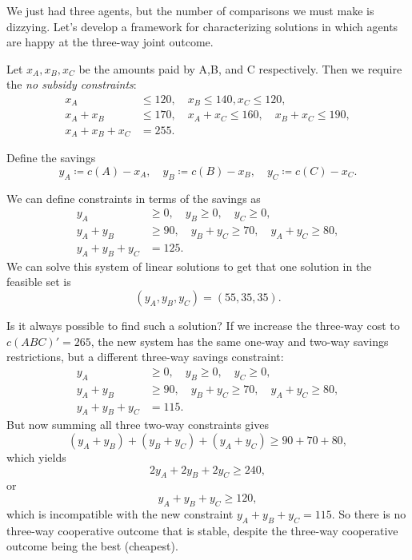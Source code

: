 We just had three agents, but the number of comparisons we must make is dizzying.
Let's develop a framework for characterizing solutions in which agents are happy at the three-way joint outcome.

Let $x_A, x_B, x_C$ be the amounts paid by A,B, and C respectively.
Then we require the \emph{no subsidy constraints}:
\begin{align*}
	x_A &\le 120, \quad x_B \le 140, x_C \le 120, \\
	x_A + x_B &\le 170, \quad x_A + x_C \le 160, \quad x_B+ x_C \le 190, \\
	x_A+x_B + x_C &= 255
.\end{align*}

Define the savings \[
	y_A \coloneqq c(A) - x_A, \quad y_B \coloneqq c(B) - x_B, \quad y_C \coloneqq c(C) - x_C
.\] 

We can define constraints in terms of the savings as
\begin{align*}
	y_A &\ge 0, \quad y_B \ge 0, \quad y_C \ge 0,\\
	y_A + y_B &\ge 90, \quad y_B + y_C \ge 70, \quad y_A + y_C \ge 80, \\
	y_A + y_B + y_C &= 125
.\end{align*}
We can solve this system of linear solutions to get that one solution in the feasible set is \[
	\left( y_A,y_B,y_C \right) = \left( 55, 35, 35 \right)
.\] 

Is it always possible to find such a solution?
If we increase the three-way cost to $c(ABC)' = 265$, the new system has the same one-way and two-way savings restrictions, but a different three-way savings constraint:
\begin{align*}
	y_A &\ge 0, \quad y_B \ge 0, \quad y_C \ge 0,\\
	y_A + y_B &\ge 90, \quad y_B + y_C \ge 70, \quad y_A + y_C \ge 80, \\
	y_A + y_B + y_C &= 115
.\end{align*}
But now summing all three two-way constraints gives \[
	(y_A + y_B) + (y_B + y_C) + (y_A + y_C) \ge 90 + 70 + 80
,\] which yields \[
	2 y_A + 2y_B + 2y_C \ge 240
,\] or \[
	y_A + y_B + y_C \ge 120
,\] 
which is incompatible with the new constraint $y_A + y_B + y_C = 115$. So there is no three-way cooperative outcome that is stable, despite the three-way cooperative outcome being the best (cheapest).

